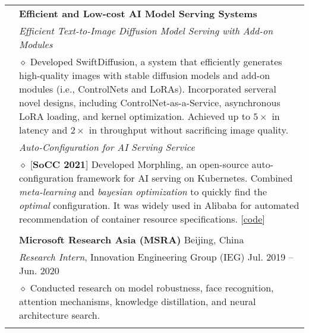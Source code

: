 \documentclass[letterpaper, 10pt]{article}
\begin{document}
\begin{longtable}{p{0.7in}p{6.0in}}
& \textbf{Efficient and Low-cost AI Model Serving Systems} \\
& \textit{\emph{Efficient Text-to-Image Diffusion Model Serving with Add-on Modules}} \\
    & $\diamond$
        Developed SwiftDiffusion, a system that efficiently generates high-quality images with stable diffusion models and add-on modules (i.e., ControlNets and LoRAs). Incorporated serveral novel designs, including ControlNet-as-a-Service, asynchronous LoRA loading, and kernel optimization. Achieved up to $5 \times$ in latency and $2 \times$ in throughput without sacrificing image quality.\\
& \textit{\emph{Auto-Configuration for AI Serving Service}} \\
    & $\diamond$
    [\textbf{SoCC 2021}]
    Developed Morphling, an open-source auto-configuration framework for AI serving on Kubernetes.
    Combined \textit{meta-learning} and \textit{bayesian optimization} to quickly find the \textit{optimal} configuration.
    It was widely used in Alibaba for automated recommendation of container resource specifications. [\href{https://github.com/kubedl-io/morphling}{\underline{code}}] \\
& \\

& {\textbf{Microsoft Research Asia (MSRA)}} \hfill Beijing, China\\
& \textit{Research Intern}, Innovation Engineering Group (IEG) \hfill Jul. 2019 -- Jun. 2020 \\
    & $\diamond$ Conducted research on model robustness, face recognition, attention mechanisms, knowledge distillation, and neural architecture search. \\
& \\


\end{longtable}
\end{document}
